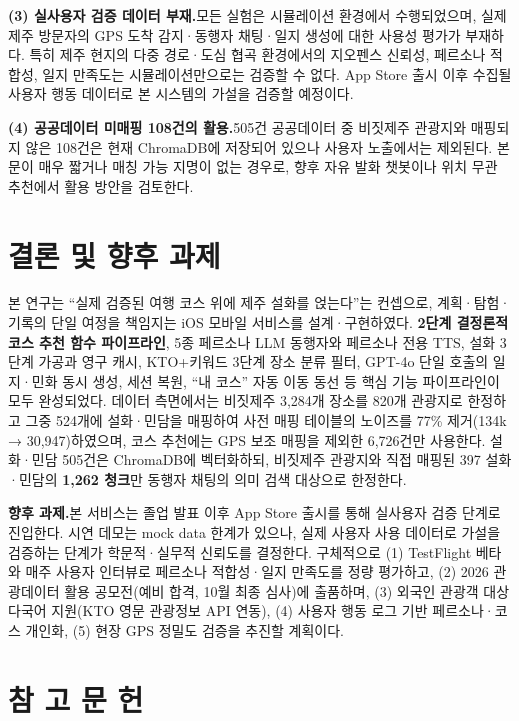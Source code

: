 \documentclass[10pt,twocolumn,a4paper]{article}
\begin{document}
\textbf{(3) 실사용자 검증 데이터 부재.}\quad 모든 실험은 시뮬레이션
환경에서 수행되었으며, 실제 제주 방문자의 GPS 도착 감지·동행자
채팅·일지 생성에 대한 사용성 평가가 부재하다. 특히 제주 현지의 다중
경로·도심 협곡 환경에서의 지오펜스 신뢰성, 페르소나 적합성, 일지 만족도는
시뮬레이션만으로는 검증할 수 없다. App Store 출시 이후 수집될 사용자 행동
데이터로 본 시스템의 가설을 검증할 예정이다.

\textbf{(4) 공공데이터 미매핑 108건의 활용.}\quad 505건 공공데이터 중
비짓제주 관광지와 매핑되지 않은 108건은 현재 ChromaDB에 저장되어 있으나
사용자 노출에서는 제외된다. 본문이 매우 짧거나 매칭 가능 지명이 없는
경우로, 향후 자유 발화 챗봇이나 위치 무관 추천에서 활용 방안을 검토한다.

\section{결론 및 향후 과제}

본 연구는 ``실제 검증된 여행 코스 위에 제주 설화를 얹는다''는 컨셉으로,
계획·탐험·기록의 단일 여정을 책임지는 iOS 모바일 서비스를 설계·구현하였다.
\textbf{2단계 결정론적 코스 추천 함수 파이프라인}, 5종 페르소나 LLM
동행자와 페르소나 전용 TTS, 설화 3단계 가공과 영구 캐시, KTO+키워드 3단계
장소 분류 필터, GPT-4o 단일 호출의 일지·민화 동시 생성, 세션 복원,
``내 코스'' 자동 이동 동선 등 핵심 기능 파이프라인이 모두 완성되었다. 데이터 측면에서는 비짓제주
3{,}284개 장소를 820개 관광지로 한정하고 그중 524개에 설화·민담을 매핑하여 사전 매핑 테이블의
노이즈를 77\% 제거(134k → 30{,}947)하였으며, 코스 추천에는 GPS 보조 매핑을 제외한 6{,}726건만
사용한다. 설화·민담 505건은 ChromaDB에 벡터화하되, 비짓제주 관광지와 직접
매핑된 397 설화·민담의 \textbf{1{,}262 청크}만 동행자 채팅의 의미 검색 대상으로 한정한다.

\textbf{향후 과제.}\quad 본 서비스는 졸업 발표 이후 App Store 출시를 통해
실사용자 검증 단계로 진입한다. 시연 데모는 mock data 한계가 있으나, 실제
사용자 사용 데이터로 가설을 검증하는 단계가 학문적·실무적 신뢰도를 결정한다.
구체적으로 (1) TestFlight 베타와 매주 사용자 인터뷰로 페르소나 적합성·일지
만족도를 정량 평가하고, (2) 2026 관광데이터 활용 공모전(예비 합격, 10월
최종 심사)에 출품하며, (3) 외국인 관광객 대상 다국어 지원(KTO 영문
관광정보 API 연동), (4) 사용자 행동 로그 기반 페르소나·코스 개인화,
(5) 현장 GPS 정밀도 검증을 추진할 계획이다.

\section*{참 고 문 헌}
\end{document}
